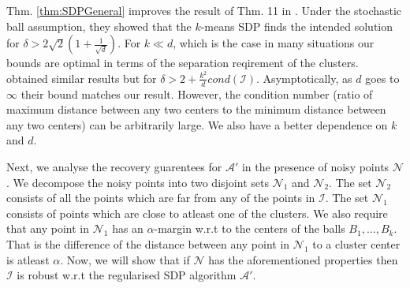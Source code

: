\documentclass[12pt]{article}
\newcommand{\mc}{\mathcal}
\begin{document}
Thm. \ref{thm:SDPGeneral} improves the result of Thm. 11 in \cite{awasthi2015relax}. Under the stochastic ball assumption, they showed that the $k$-means SDP finds the intended solution for $\delta > 2\sqrt{2}(1+\frac{1}{\sqrt{d}})$. For $k \ll d$, which is the case in many situations our bounds are optimal in terms of the separation reqirement of the clusters.  \cite{iguchi2015tightness} obtained similar results but for $\delta > 2 + \frac{k^2}{d}cond(\mc I)$. Asymptotically, as $d$ goes to $\infty$ their bound matches our result. However, the condition number (ratio of maximum distance between any two centers to the minimum distance between any two centers) can be arbitrarily large. We also have a better dependence on $k$ and $d$. 

Next, we analyse the recovery guarentees for $\mc A'$ in the presence of noisy points $\mc N$. We decompose the noisy points into two disjoint sets $\mc N_1$ and $\mc N_2$. The set $\mc N_2$ consists of all the points which are far from any of the points in $\mc I$. The set $\mc N_1$ consists of points which are close to atleast one of the clusters. We also require that any point in $\mc N_1$ has an $\alpha$-margin w.r.t to the centers of the balls $B_1, \ldots, B_k$. That is the difference of the distance between any point in $\mc N_1$ to a cluster center is atleast $\alpha$. Now, we will show that if $\mc N$ has the aforementioned properties then $\mc I$ is robust w.r.t the regularised SDP algorithm $\mc A'$.
\end{document}
